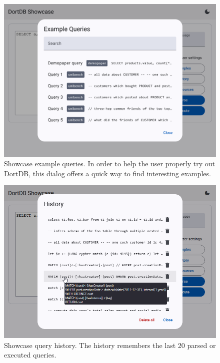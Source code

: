 \begin{figure}[!h]
    \centering
    \includegraphics[width=0.8\linewidth]{img/showcase_example_queries.png}
    \caption{Showcase example queries. In order to help the user properly try out DortDB, this dialog offers a quick way to find interesting examples.}
\end{figure}

\begin{figure}[!h]
    \centering
    \includegraphics[width=0.8\linewidth]{img/showcase_history.png}
    \caption{Showcase query history. The history remembers the last 20 parsed or executed queries.}
\end{figure}

